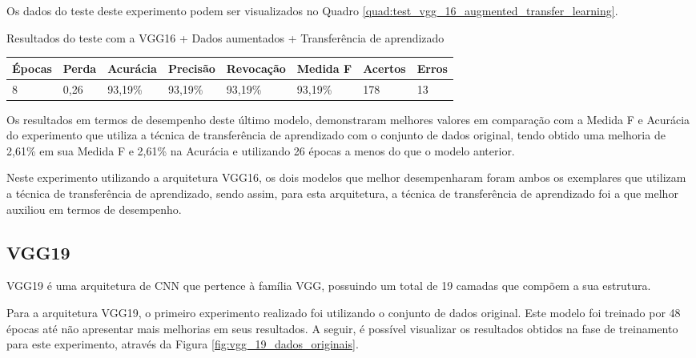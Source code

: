 \documentclass[
	12pt,				%
	oneside,			%
	a4paper,			%
	english,			%
	brazil				%
	]{abntex2ppgsi}
\begin{document}
Os dados do teste deste experimento podem ser visualizados no Quadro \ref{quad:test_vgg_16_augmented_transfer_learning}.

\begin{quadro}[H]
\caption{Resultados do teste com a VGG16 + Dados aumentados + Transferência de aprendizado}
\label{quad:test_vgg_16_augmented_transfer_learning}
\centering
\begin{tabular}{|l|l|l|l|l|l|l|l|}
\cline{1-8}
Épocas & Perda & Acurácia & Precisão & Revocação & Medida F & Acertos & Erros \\ \hline
8 & 0,26 & 93,19\% & 93,19\% & 93,19\% & 93,19\% & 178 & 13 \\
\cline{1-8}
\end{tabular}
\end{quadro}

Os resultados em termos de desempenho deste último modelo, demonstraram melhores valores em comparação com a Medida F e Acurácia do experimento que utiliza a técnica de transferência de aprendizado com o conjunto de dados original, tendo obtido uma melhoria de 2,61\% em sua Medida F e 2,61\% na Acurácia e utilizando 26 épocas a menos do que o modelo anterior.

Neste experimento utilizando a arquitetura VGG16, os dois modelos que melhor desempenharam foram ambos os exemplares que utilizam a técnica de transferência de aprendizado, sendo assim, para esta arquitetura, a técnica de transferência de aprendizado foi a que melhor auxiliou em termos de desempenho.

\subsection{VGG19}
VGG19 é uma arquitetura de CNN que pertence à família VGG, possuindo um total de 19 camadas que compõem a sua estrutura.

Para a arquitetura VGG19, o primeiro experimento realizado foi utilizando o conjunto de dados original. Este modelo foi treinado por 48 épocas até não apresentar mais melhorias em seus resultados. A seguir, é possível visualizar os resultados obtidos na fase de treinamento para este experimento, através da Figura \ref{fig:vgg_19_dados_originais}.
\end{document}
